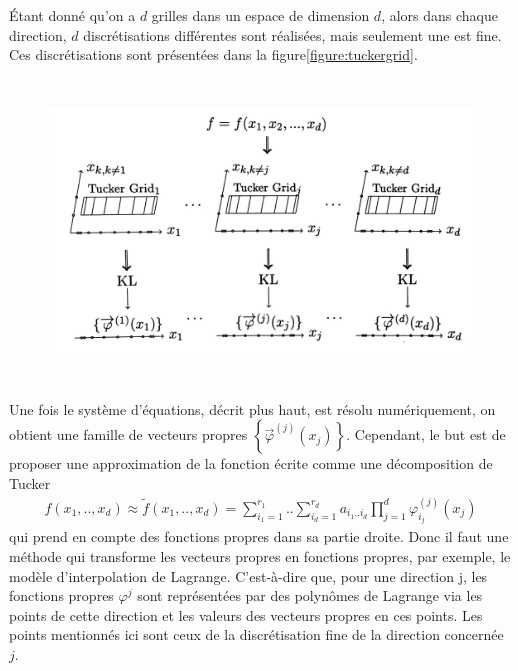 Étant donné qu'on a $d$ grilles dans un espace de dimension $d$, alors dans chaque direction, $d$ discrétisations différentes sont réalisées, mais seulement une est fine. Ces discrétisations sont présentées dans la figure\ref{figure:tuckergrid}.
\begin{center}
\begin{figure}[!h]
    \centering
		\includegraphics[width=\linewidth,height=8cm]{images/tuckergrid.jpg}
\end{figure}
\label{figure:tuckergrid}
\end{center}

Une fois le système d'équations, décrit plus haut, est résolu numériquement, on obtient une famille de vecteurs propres $\left \{ \overrightarrow{\varphi}^{(j)}(x_j) \right \}$. Cependant, le but est de proposer une approximation de la fonction écrite comme une décomposition de Tucker
\begin{align}
	f(x_1,..,x_d) \approx \tilde{f}(x_1,..,x_d) = \sum_{i_1=1}^{r_1}..\sum_{i_d=1}^{r_d}a_{i_1..i_d}\prod_{j=1}^d \varphi_{i_j}^{(j)}(x_j)
	\label{tuckerequation}
\end{align}
qui prend en compte des fonctions propres dans sa partie droite. Donc il faut une méthode qui transforme les vecteurs propres en fonctions propres, par exemple, le modèle d'interpolation de Lagrange. C'est-à-dire que, pour une direction j, les fonctions propres $\varphi^{j}$ sont représentées par des polynômes de Lagrange via les points de cette direction et les valeurs des vecteurs propres en ces points. Les points mentionnés ici sont ceux de la discrétisation fine de la direction concernée $j$.

